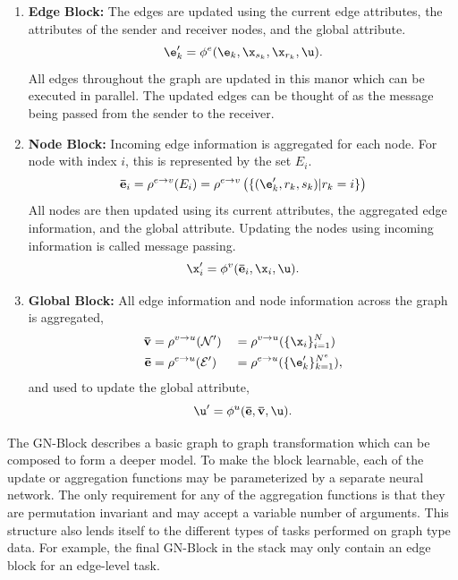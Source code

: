 \begin{enumerate}
    \item \textbf{Edge Block:} The edges are updated using the current edge attributes, the attributes of the sender and receiver nodes, and the global attribute.
    \begin{equation}
        \e_k' = \phi^e(\e_k, \x_{s_k}, \x_{r_k}, \u).
    \end{equation}
    All edges throughout the graph are updated in this manor which can be executed in parallel.
    The updated edges can be thought of as the message being passed from the sender to the receiver.
    \item \textbf{Node Block:} Incoming edge information is aggregated for each node.
    For node with index $i$, this is represented by the set $E_i$.
    \begin{equation}
        \mathbf{\bar{e}}_i = \rho^{e \to v}(E_i) = \rho^{e \to v}\left(\{(\e_k', r_k, s_k) | r_k = i\}\right)
    \end{equation}
    All nodes are then updated using its current attributes, the aggregated edge information, and the global attribute.
    Updating the nodes using incoming information is called message passing.
    \begin{equation}
        \x_i' = \phi^v(\mathbf{\bar{e}}_i, \x_i, \u).
    \end{equation}
    \item \textbf{Global Block:} All edge information and node information across the graph is aggregated,
    \begin{alignat}{2}
        \mathbf{\bar{v}} &= \rho^{v \to u}(\mathcal{N}') &&= \rho^{v \to u}(\{\x_i\}_{i=1}^{N}) \\
        \mathbf{\bar{e}} &= \rho^{e \to u}(\mathcal{E}') &&= \rho^{e \to u}(\{\e_k'\}_{k=1}^{N^e}),
    \end{alignat}
    and used to update the global attribute,
    \begin{equation}
        \u' = \phi^u( \mathbf{\bar{e}}, \mathbf{\bar{v}}, \u).
    \end{equation}
\end{enumerate}

The GN-Block describes a basic graph to graph transformation which can be composed to form a deeper model.
To make the block learnable, each of the update or aggregation functions may be parameterized by a separate neural network.
The only requirement for any of the aggregation functions is that they are permutation invariant and may accept a variable number of arguments.
This structure also lends itself to the different types of tasks performed on graph type data.
For example, the final GN-Block in the stack may only contain an edge block for an edge-level task.

